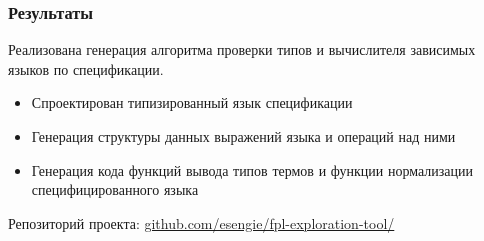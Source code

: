 
\begin{frame}
\frametitle{Результаты}
Реализована генерация алгоритма проверки типов и вычислителя зависимых языков по спецификации.
\begin{itemize}
\item Спроектирован типизированный язык спецификации
\item Генерация структуры данных выражений языка и операций над ними
\item Генерация кода функций вывода типов термов и функции нормализации специфицированного языка
\end{itemize}

Репозиторий проекта: \url{github.com/esengie/fpl-exploration-tool/}
\end{frame}

%
%
